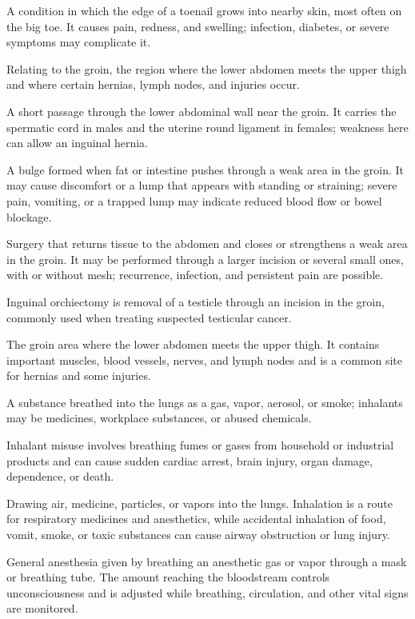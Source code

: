  A condition in which the edge of a toenail grows into nearby skin, most often on the big toe. It causes pain, redness, and swelling; infection, diabetes, or severe symptoms may complicate it.

 Relating to the groin, the region where the lower abdomen meets the upper thigh and where certain hernias, lymph nodes, and injuries occur.

 A short passage through the lower abdominal wall near the groin. It carries the spermatic cord in males and the uterine round ligament in females; weakness here can allow an inguinal hernia.

 A bulge formed when fat or intestine pushes through a weak area in the groin. It may cause discomfort or a lump that appears with standing or straining; severe pain, vomiting, or a trapped lump may indicate reduced blood flow or bowel blockage.

 Surgery that returns tissue to the abdomen and closes or strengthens a weak area in the groin. It may be performed through a larger incision or several small ones, with or without mesh; recurrence, infection, and persistent pain are possible.

 Inguinal orchiectomy is removal of a testicle through an incision in the groin, commonly used when treating suspected testicular cancer.

 The groin area where the lower abdomen meets the upper thigh. It contains important muscles, blood vessels, nerves, and lymph nodes and is a common site for hernias and some injuries.

 A substance breathed into the lungs as a gas, vapor, aerosol, or smoke; inhalants may be medicines, workplace substances, or abused chemicals.

 Inhalant misuse involves breathing fumes or gases from household or industrial products and can cause sudden cardiac arrest, brain injury, organ damage, dependence, or death.

 Drawing air, medicine, particles, or vapors into the lungs. Inhalation is a route for respiratory medicines and anesthetics, while accidental inhalation of food, vomit, smoke, or toxic substances can cause airway obstruction or lung injury.

 General anesthesia given by breathing an anesthetic gas or vapor through a mask or breathing tube. The amount reaching the bloodstream controls unconsciousness and is adjusted while breathing, circulation, and other vital signs are monitored.

